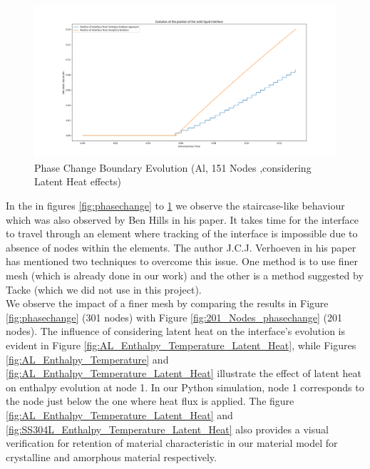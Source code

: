 \begin{figure}[h]
  \centering
  \includegraphics[width=15cm]{img/Evolution_of_mushy_zone_when_the_latent_heat_is_on.png}
  \caption{Phase Change Boundary Evolution (Al, 151 Nodes ,considering Latent Heat effects)}
  \label{fig:AL_Latenthear}
\end{figure}
\newpage
 In the in figures \ref{fig:phasechange} to \ref{fig:AL_Latenthear} we observe the staircase-like behaviour which was also observed by Ben Hills\cite{Hills_2016} in his paper. It takes time for the interface to travel through an element where tracking of the interface is impossible due to absence of nodes within the elements. The author J.C.J. Verhoeven in his paper \cite{verhoeven2003modelling} has mentioned two techniques to overcome this issue. One method is to use finer mesh (which is already done in our work) and the other is a method suggested by Tacke\cite{Tacke1985DiscretizationOT} (which we did not use in this project).\\
 We observe the impact of a finer mesh by comparing the results in Figure \ref{fig:phasechange} (301 nodes) with Figure \ref{fig:201_Nodes_phasechange} (201 nodes). The influence of considering latent heat on the interface's evolution is evident in Figure \ref{fig:AL_Enthalpy_Temperature_Latent_Heat}, while Figures \ref{fig:AL_Enthalpy_Temperature} and \ref{fig:AL_Enthalpy_Temperature_Latent_Heat} illustrate the effect of latent heat on enthalpy evolution at node 1. In our Python simulation, node 1 corresponds to the node just below the one where heat flux is applied. The figure \ref{fig:AL_Enthalpy_Temperature_Latent_Heat} and \ref{fig:SS304L_Enthalpy_Temperature_Latent_Heat} also provides a visual verification for retention of material characteristic in our material model for crystalline and amorphous material respectively. 
